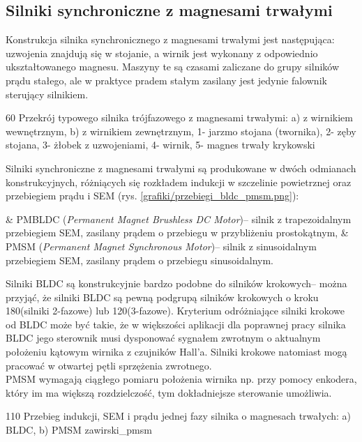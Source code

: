 \subsection{Silniki synchroniczne z magnesami trwałymi}

Konstrukcja silnika synchronicznego z magnesami trwałymi jest następująca: uzwojenia znajdują się w stojanie, a wirnik jest wykonany z odpowiednio ukształtowanego magnesu. Maszyny te są czasami  zaliczane do grupy silników prądu stałego, ale w praktyce pradem stałym zasilany jest jedynie falownik sterujący silnikiem. 

		{60}
		{Przekrój typowego silnika trójfazowego z magnesami trwałymi: a) z wirnikiem wewnętrznym, b) z wirnikiem zewnętrznym, 1- jarzmo stojana (twornika), 2- zęby stojana, 3- żłobek z uzwojeniami, 4- wirnik, 5- magnes trwały}
		{krykowski}
		
Silniki synchroniczne z magnesami trwałymi są produkowane w dwóch odmianach konstrukcyjnych, różniących się rozkładem indukcji w szczelinie powietrznej oraz przebiegiem prądu i SEM (rys. \ref{grafiki/przebiegi_bldc_pmsm.png}): \\

\begin{easylist}
	& PMBLDC ({\it Permanent Magnet Brushless DC Motor})-- silnik z trapezoidalnym przebiegiem SEM, zasilany prądem o przebiegu w przybliżeniu prostokątnym,
	& PMSM ({\it Permanent Magnet Synchronous Motor})-- silnik z sinusoidalnym przebiegiem SEM, zasilany prądem o przebiegu sinusoidalnym.
	\\
\end{easylist} 
		
Silniki BLDC są konstrukcyjnie bardzo podobne do silników krokowych-- można przyjąć, że silniki BLDC są pewną podgrupą silników krokowych o kroku 180\degree (silniki 2-fazowe) lub 120\degree (3-fazowe). Kryterium odróżniające silniki krokowe od BLDC może być takie, że w większości aplikacji dla poprawnej pracy silnika BLDC jego sterownik musi dysponować sygnałem zwrotnym o aktualnym położeniu kątowym wirnika z czujników Hall'a. Silniki krokowe natomiast mogą pracować w otwartej pętli sprzężenia zwrotnego. \\

PMSM wymagają ciągłego pomiaru położenia wirnika np. przy pomocy enkodera, który im ma większą rozdzielczość, tym dokładniejsze sterowanie umożliwia.

		{110}
		{Przebieg indukcji, SEM i prądu jednej fazy silnika o magnesach trwałych: a) BLDC, b) PMSM}
		{zawirski_pmsm} 

